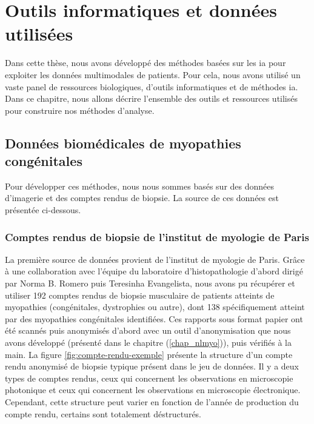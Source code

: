 \chapter{Outils informatiques et données utilisées}

Dans cette thèse, nous avons développé des méthodes basées sur les \gls{ia} pour exploiter les données multimodales de patients. Pour cela, nous avons utilisé un vaste panel de ressources biologiques, d'outils informatiques et de méthodes \gls{ia}. Dans ce chapitre, nous allons décrire l'ensemble des outils et ressources utilisés pour construire nos méthodes d'analyse.

\section{Données biomédicales de myopathies congénitales}
Pour développer ces méthodes, nous nous sommes basés sur des données d'imagerie et des comptes rendus de biopsie. La source de ces données est présentée ci-dessous.

\subsection{Comptes rendus de biopsie de l'institut de myologie de Paris}
La première source de données provient de l'institut de myologie de Paris. Grâce à une collaboration avec l'équipe du laboratoire d’histopathologie d'abord dirigé par Norma B. Romero puis Teresinha Evangelista, nous avons pu récupérer et utiliser 192 comptes rendus de biopsie musculaire de patients atteints de myopathies (congénitales, dystrophies ou autre), dont 138 spécifiquement atteint par des myopathies congénitales identifiées. Ces rapports sous format papier ont été scannés puis anonymisés d'abord avec un outil d'anonymisation que nous avons développé (présenté dans le chapitre (\ref{chap_nlmyo})), puis vérifiés à la main. La figure \ref{fig:compte-rendu-exemple} présente la structure d'un compte rendu anonymisé de biopsie typique présent dans le jeu de données. Il y a deux types de comptes rendus, ceux qui concernent les observations en microscopie photonique et ceux qui concernent les observations en microscopie électronique. Cependant, cette structure peut varier en fonction de l'année de production du compte rendu, certains sont totalement déstructurés.

